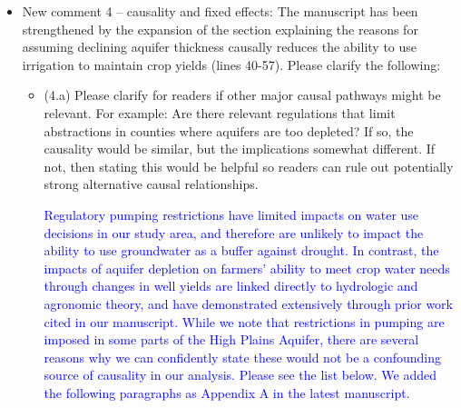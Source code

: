 \documentclass[
]{article}
\begin{document}
\begin{itemize}
\item New comment 4 – causality and fixed effects: The manuscript has been strengthened by the expansion of the section explaining the reasons for assuming declining aquifer thickness causally reduces the ability to use irrigation to maintain crop yields (lines 40-57). Please clarify the following:

  \begin{itemize}
  \item (4.a) Please clarify for readers if other major causal pathways might be relevant. For example: Are there relevant regulations that limit abstractions in counties where aquifers are too depleted? If so, the causality would be similar, but the implications somewhat different. If not, then stating this would be helpful so readers can rule out potentially strong alternative causal relationships.


  \textcolor{blue}{Regulatory pumping restrictions have limited impacts on water use decisions in our study area, and therefore are unlikely to impact the ability to use groundwater as a buffer against drought. In contrast, the impacts of aquifer depletion on farmers' ability to meet crop water needs through changes in well yields are linked directly to hydrologic and agronomic theory, and have demonstrated extensively through prior work cited in our manuscript. While we note that restrictions in pumping are imposed in some parts of the High Plains Aquifer, there are several reasons why we can confidently state these would not be a confounding source of causality in our analysis. Please see the list below. We added the following paragraphs as Appendix A in the latest manuscript.

}
\end{itemize}
\end{itemize}
\end{document}
